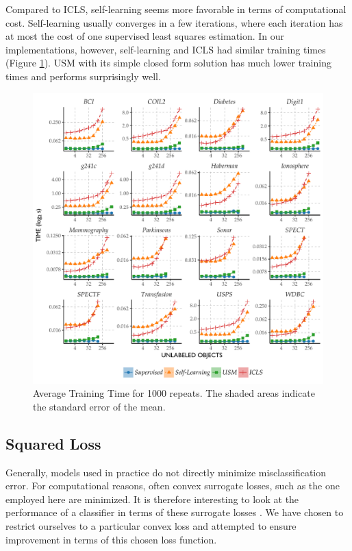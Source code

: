 \documentclass[twoside]{memoir}\usepackage[]{graphicx}\usepackage{xcolor}
\makeatletter
\def\maxwidth{ %
  \ifdim\Gin@nat@width>\linewidth
    \linewidth
  \else
    \Gin@nat@width
  \fi
}
\newenvironment{knitrout}{}{} %
\makeatother
\begin{document}
Compared to ICLS, self-learning seems more favorable in terms of computational cost. Self-learning usually converges in a few iterations, where each iteration has at most the cost of one supervised least squares estimation. In our implementations, however, self-learning and ICLS had similar training times (Figure \ref{fig:timecurves}). USM with its simple closed form solution has much lower training times and performs surprisingly well.


\begin{knitrout}
\color{fgcolor}\begin{figure}
\includegraphics[width=\maxwidth]{figure/timecurves-1} \caption[Average Training Time for 1000 repeats]{Average Training Time for 1000 repeats. The shaded areas indicate the standard error of the mean.}\label{fig:timecurves}
\end{figure}


\end{knitrout}

\subsection*{Squared Loss}
Generally, models used in practice do not directly minimize misclassification error. For computational reasons, often convex surrogate losses, such as the one employed here are minimized. It is therefore interesting to look at the performance of a classifier in terms of these surrogate losses \citep{Loog2016a}. We have chosen to restrict ourselves to a particular convex loss and attempted to ensure improvement in terms of this chosen loss function.
\end{document}
